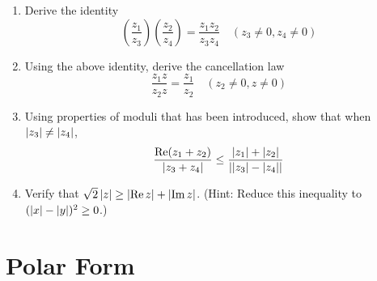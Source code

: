 \documentclass[11pt, oneside]{book}
\begin{document}
\begin{enumerate}
	\item Derive the identity
	\begin{equation*}
		\left( \frac{z_1}{z_3} \right)\left( \frac{z_2}{z_4} \right) = \frac{z_1 z_2}{z_3 z_4} \quad (z_3 \neq 0, z_4 \neq 0)
	\end{equation*}

	\item Using the above identity, derive the cancellation law
	\begin{equation*}
		\frac{z_1 z}{z_2 z} = \frac{z_1}{z_2} \quad (z_2 \neq 0, z \neq 0)
	\end{equation*}

	\item Using properties of moduli that has been introduced, show that when $\left|z_3\right| \neq \left|z_4\right|$,
	\begin{equation*}
		\frac{\operatorname{Re}(z_1 + z_2)}{\left|z_3 + z_4\right|} \leq \frac{\left|z_1\right| + \left|z_2\right|}{\left|\left|z_3\right| - \left|z_4\right|\right|} 
	\end{equation*}

	\item Verify that $\sqrt{2}\left|z\right| \geq \left|\operatorname{Re} z\right| + \left|\operatorname{Im} z\right|$. (Hint: Reduce this inequality to $(\left|x\right| - \left|y\right|)^2 \geq 0$.)
\end{enumerate}


\section{Polar Form} %
\label{sec:polar_form}
\end{document}
